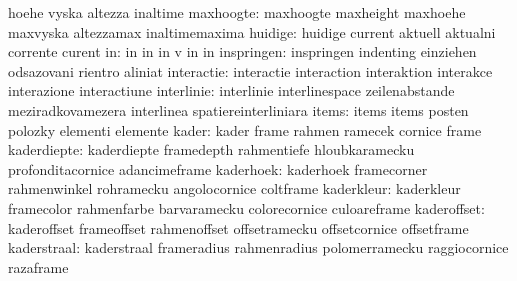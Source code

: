                            hoehe                     vyska
                           altezza                   inaltime
                maxhoogte: maxhoogte                 maxheight
                           maxhoehe                  maxvyska
                           altezzamax                inaltimemaxima
                  huidige: huidige                   current
                           aktuell                   aktualni
                           corrente                  curent
                       in: in                        in
                           in                        v
                           in                        in
               inspringen: inspringen                indenting
                           einziehen                 odsazovani
                           rientro                   aliniat
               interactie: interactie                interaction
                           interaktion               interakce
                           interazione               interactiune
               interlinie: interlinie                interlinespace
                           zeilenabstande            meziradkovamezera
                           interlinea                spatiereinterliniara
                    items: items                     items
                           posten                    polozky
                           elementi                  elemente
                    kader: kader                     frame
                           rahmen                    ramecek
                           cornice                   frame
              kaderdiepte: kaderdiepte               framedepth
                           rahmentiefe               hloubkaramecku
                           profonditacornice         adancimeframe
                kaderhoek: kaderhoek                 framecorner
                           rahmenwinkel              rohramecku
                           angolocornice             coltframe
               kaderkleur: kaderkleur                framecolor
                           rahmenfarbe               barvaramecku
                           colorecornice             culoareframe
              kaderoffset: kaderoffset               frameoffset
                           rahmenoffset              offsetramecku
                           offsetcornice             offsetframe
              kaderstraal: kaderstraal               frameradius
                           rahmenradius              polomerramecku
                           raggiocornice             razaframe
